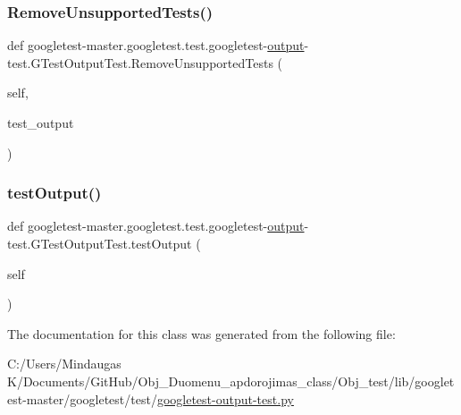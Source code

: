 \subsubsection{\texorpdfstring{RemoveUnsupportedTests()}{RemoveUnsupportedTests()}}
{\footnotesize\ttfamily def googletest-\/master.\+googletest.\+test.\+googletest-\/\mbox{\hyperlink{namespacegoogletest-master_1_1googletest_1_1test_1_1googletest-output-test_a734f0a5bd94ba038f4350763c6977129}{output}}-\/test.\+G\+Test\+Output\+Test.\+Remove\+Unsupported\+Tests (\begin{DoxyParamCaption}\item[{}]{self,  }\item[{}]{test\+\_\+output }\end{DoxyParamCaption})}

\mbox{\label{classgoogletest-master_1_1googletest_1_1test_1_1googletest-output-test_1_1_g_test_output_test_a0df9046425dd1a9a691f7cacab87c33b}} 
\subsubsection{\texorpdfstring{testOutput()}{testOutput()}}
{\footnotesize\ttfamily def googletest-\/master.\+googletest.\+test.\+googletest-\/\mbox{\hyperlink{namespacegoogletest-master_1_1googletest_1_1test_1_1googletest-output-test_a734f0a5bd94ba038f4350763c6977129}{output}}-\/test.\+G\+Test\+Output\+Test.\+test\+Output (\begin{DoxyParamCaption}\item[{}]{self }\end{DoxyParamCaption})}



The documentation for this class was generated from the following file\+:\begin{DoxyCompactItemize}
\item 
C\+:/\+Users/\+Mindaugas K/\+Documents/\+Git\+Hub/\+Obj\+\_\+\+Duomenu\+\_\+apdorojimas\+\_\+class/\+Obj\+\_\+test/lib/googletest-\/master/googletest/test/\mbox{\hyperlink{_obj__test_2lib_2googletest-master_2googletest_2test_2googletest-output-test_8py}{googletest-\/output-\/test.\+py}}\end{DoxyCompactItemize}
